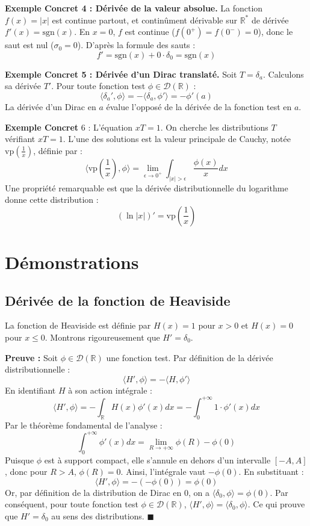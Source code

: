 \documentclass[11pt,a4paper]{article}
\begin{document}
\textbf{Exemple Concret 4 : Dérivée de la valeur absolue.}
La fonction $f(x) = |x|$ est continue partout, et continûment dérivable sur $\mathbb{R}^*$ de dérivée $f'(x) = \text{sgn}(x)$.
En $x=0$, $f$ est continue ($f(0^+) = f(0^-) = 0$), donc le saut est nul ($\sigma_0 = 0$).
D'après la formule des sauts :
$$ f' = \text{sgn}(x) + 0 \cdot \delta_0 = \text{sgn}(x) $$

\textbf{Exemple Concret 5 : Dérivée d'un Dirac translaté.}
Soit $T = \delta_a$. Calculons sa dérivée $T'$.
Pour toute fonction test $\phi \in \mathcal{D}(\mathbb{R})$ :
$$ \langle \delta_a', \phi \rangle = - \langle \delta_a, \phi' \rangle = - \phi'(a) $$
La dérivée d'un Dirac en $a$ évalue l'opposé de la dérivée de la fonction test en $a$.

\textbf{Exemple Concret} 6 : L'équation $x T = 1$.
On cherche les distributions $T$ vérifiant $xT = 1$. L'une des solutions est la valeur principale de Cauchy, notée $\text{vp}(\frac{1}{x})$, définie par :
$$ \langle \text{vp}\left(\frac{1}{x}\right), \phi \rangle = \lim_{\epsilon \to 0^+} \int_{|x|>\epsilon} \frac{\phi(x)}{x} dx $$
Une propriété remarquable est que la dérivée distributionnelle du logarithme donne cette distribution :
$$ (\ln|x|)' = \text{vp}\left(\frac{1}{x}\right) $$


\section{Démonstrations}

\subsection{Dérivée de la fonction de Heaviside}

La fonction de Heaviside est définie par $H(x) = 1$ pour $x > 0$ et $H(x) = 0$ pour $x \le 0$.
Montrons rigoureusement que $H' = \delta_0$.

\textbf{Preuve :}
Soit $\phi \in \mathcal{D}(\mathbb{R})$ une fonction test. Par définition de la dérivée distributionnelle :
$$ \langle H', \phi \rangle = - \langle H, \phi' \rangle $$
En identifiant $H$ à son action intégrale :
$$ \langle H', \phi \rangle = - \int_{\mathbb{R}} H(x) \phi'(x) dx = - \int_0^{+\infty} 1 \cdot \phi'(x) dx $$
Par le théorème fondamental de l'analyse :
$$ \int_0^{+\infty} \phi'(x) dx = \lim_{R \to +\infty} \phi(R) - \phi(0) $$
Puisque $\phi$ est à support compact, elle s'annule en dehors d'un intervalle $[-A, A]$, donc pour $R > A$, $\phi(R) = 0$.
Ainsi, l'intégrale vaut $-\phi(0)$.
En substituant :
$$ \langle H', \phi \rangle = - ( - \phi(0) ) = \phi(0) $$
Or, par définition de la distribution de Dirac en 0, on a $\langle \delta_0, \phi \rangle = \phi(0)$.
Par conséquent, pour toute fonction test $\phi \in \mathcal{D}(\mathbb{R})$, $\langle H', \phi \rangle = \langle \delta_0, \phi \rangle$.
Ce qui prouve que $H' = \delta_0$ au sens des distributions. $\blacksquare$
\end{document}
